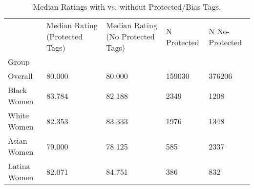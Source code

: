 \begin{table}[htbp]
\centering
\caption{Median Ratings with vs. without Protected/Bias Tags.}
\label{tab:eda_protected_rating_medians}
\begin{tabular}{lllll}
\toprule
 & Median Rating (Protected Tags) & Median Rating (No Protected Tags) & N Protected & N No-Protected \\
Group &  &  &  &  \\
\midrule
Overall & 80.000 & 80.000 & 159030 & 376206 \\
Black Women & 83.784 & 82.188 & 2349 & 1208 \\
White Women & 82.353 & 83.333 & 1976 & 1348 \\
Asian Women & 79.000 & 78.125 & 585 & 2337 \\
Latina Women & 82.071 & 84.751 & 386 & 832 \\
\bottomrule
\end{tabular}

\end{table}